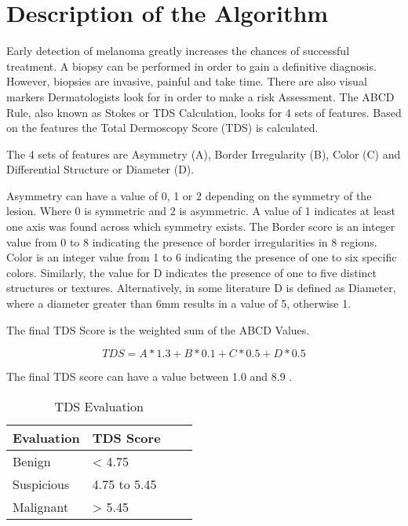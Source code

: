 \section{Description of the Algorithm}

Early detection of melanoma greatly increases the chances of successful treatment. A biopsy can be performed in order to gain a definitive diagnosis. However, biopsies are invasive, painful and take time. There are also visual markers Dermatologists look for in order to make a risk Assessment. The ABCD Rule, also known as Stokes or TDS Calculation, looks for 4 sets of features. Based on the features the Total Dermoscopy Score (TDS) is calculated.

The 4 sets of features are Asymmetry (A), Border Irregularity (B), Color (C) and Differential Structure or Diameter (D).

Asymmetry can have a value of 0, 1 or 2 depending on the symmetry of the lesion. Where 0 is symmetric and 2 is asymmetric. A value of 1 indicates at least one axis was found across which symmetry exists. The Border score is an integer value from 0 to 8 indicating the presence of border irregularities in 8 regions. Color is an integer value from 1 to 6 indicating the presence of one to six specific colors. Similarly, the value for D indicates the presence of one to five distinct structures or textures. Alternatively, in some literature\cite{Siddiq_2015} D is defined as Diameter, where a diameter greater than 6mm results in a value of 5, otherwise 1.

The final TDS Score is the weighted sum of the ABCD Values.

\begin{equation}
TDS = A * 1.3 + B * 0.1 + C * 0.5 + D * 0.5
\end{equation}

The final TDS score can have a value between 1.0 and 8.9 .

\begin{table}[H]
\small
    \begin{tabular}{ | l | p{3.5cm} | l | p{3.5cm} |}
    \hline
    Evaluation & TDS Score \\ \hline
    Benign & < 4.75  \\ \hline
    Suspicious & 4.75 to 5.45  \\ \hline
    Malignant & > 5.45  \\ \hline

    \end{tabular}

    \caption{TDS Evaluation}
    \label{fig:tds_eval}

\end{table}



